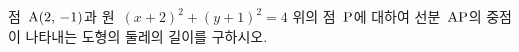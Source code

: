점~$\mathrm{A}(2,\,-1)$과 원~$(x+2)^2+(y+1)^2=4$ 위의 점~$\mathrm{P}$에 대하여 선분~$\mathrm{AP}$의 중점이 나타내는 도형의 둘레의 길이를 구하시오.
